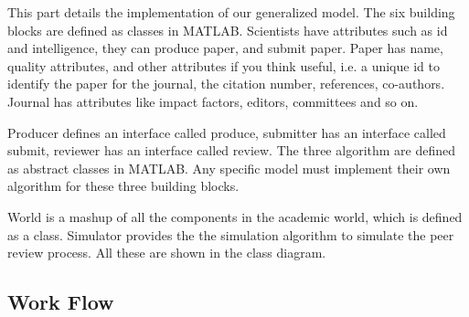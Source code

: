 \documentclass[11pt]{article}
\begin{document}
\begin{figure}[h]
\end{figure}

This part details the implementation of our generalized model. The six building blocks are defined as classes in MATLAB. Scientists have attributes such as id and intelligence, they can produce paper, and submit paper. Paper has name, quality attributes, and other attributes if you think useful, i.e. a unique id to identify the paper for the journal, the citation number, references, co-authors. Journal has attributes like impact factors, editors, committees and so on.

Producer defines an interface called produce, submitter has an interface called submit, reviewer has an interface called review. The three algorithm are defined as abstract classes in MATLAB. Any specific model must implement their own algorithm for these three building blocks.

World is a mashup of all the components in the academic world, which is defined as a class. Simulator provides the the simulation algorithm to simulate the peer review process. All these are shown in the class diagram.

\subsection{Work Flow}
\end{document}
